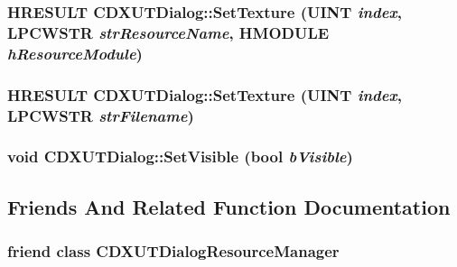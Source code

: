 \label{class_c_d_x_u_t_dialog_adb63ce7dfbc73250cf7ecd45b424ab96}
\hypertarget{class_c_d_x_u_t_dialog_a136fb315f7d3405c9bd59cac96d32acc}{
\subsubsection[{SetTexture}]{\setlength{\rightskip}{0pt plus 5cm}HRESULT CDXUTDialog::SetTexture (UINT {\em index}, \/  LPCWSTR {\em strResourceName}, \/  HMODULE {\em hResourceModule})}}
\label{class_c_d_x_u_t_dialog_a136fb315f7d3405c9bd59cac96d32acc}
\hypertarget{class_c_d_x_u_t_dialog_aa391160093e64b7ea6b23b334079d960}{
\subsubsection[{SetTexture}]{\setlength{\rightskip}{0pt plus 5cm}HRESULT CDXUTDialog::SetTexture (UINT {\em index}, \/  LPCWSTR {\em strFilename})}}
\label{class_c_d_x_u_t_dialog_aa391160093e64b7ea6b23b334079d960}
\hypertarget{class_c_d_x_u_t_dialog_aa390f99d291ba0acb73a01dbb7add794}{
\subsubsection[{SetVisible}]{\setlength{\rightskip}{0pt plus 5cm}void CDXUTDialog::SetVisible (bool {\em bVisible})}}
\label{class_c_d_x_u_t_dialog_aa390f99d291ba0acb73a01dbb7add794}


\subsection{Friends And Related Function Documentation}
\hypertarget{class_c_d_x_u_t_dialog_a9f01c7e77f6c0b33ee51859336171041}{
\subsubsection[{CDXUTDialogResourceManager}]{\setlength{\rightskip}{0pt plus 5cm}friend class {\bf CDXUTDialogResourceManager}}}
\label{class_c_d_x_u_t_dialog_a9f01c7e77f6c0b33ee51859336171041}


